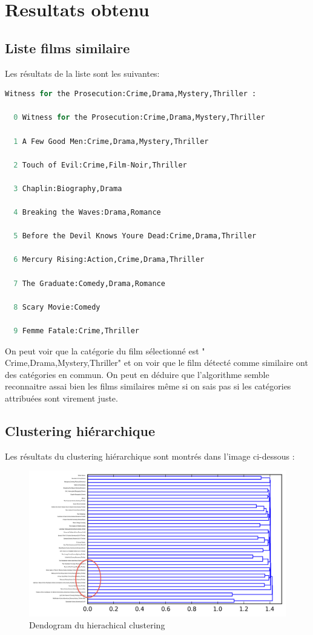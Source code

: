 \chapter{Resultats obtenu}
\section{Liste films similaire}

Les résultats de la liste sont les suivantes:

\begin{lstlisting}[language=python]
  Witness for the Prosecution:Crime,Drama,Mystery,Thriller :

  0 Witness for the Prosecution:Crime,Drama,Mystery,Thriller

  1 A Few Good Men:Crime,Drama,Mystery,Thriller

  2 Touch of Evil:Crime,Film-Noir,Thriller

  3 Chaplin:Biography,Drama

  4 Breaking the Waves:Drama,Romance

  5 Before the Devil Knows Youre Dead:Crime,Drama,Thriller

  6 Mercury Rising:Action,Crime,Drama,Thriller

  7 The Graduate:Comedy,Drama,Romance

  8 Scary Movie:Comedy

  9 Femme Fatale:Crime,Thriller
\end{lstlisting}

On peut voir que la catégorie du film sélectionné est "	Crime,Drama,Mystery,Thriller" et on voir que le film détecté comme similaire ont des catégories en commun. On peut en déduire que l'algorithme semble reconnaitre assai bien les films similaires même si on sais pas si les catégories attribuées sont virement juste. 


\section{Clustering hiérarchique}

Les résultats du clustering hiérarchique sont montrés dans l'image ci-dessous :

\begin{figure}[h]
  \centering
    \includegraphics[width=0.6\linewidth]{img/clustering50_tf_idf.png}
  \caption{Dendogram du hierachical clustering}
  \label{hierarchical}
\end{figure}

